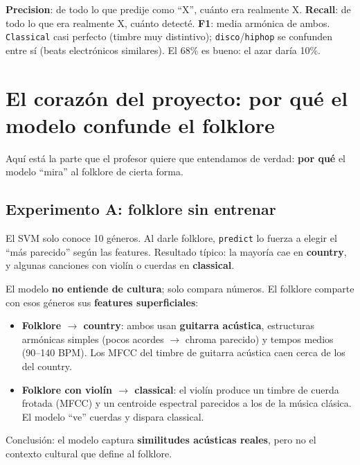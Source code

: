 \documentclass[11pt,a4paper]{article}
\newenvironment{ideabox}[1]{\begin{mdframed}[style=ideastyle,frametitle={#1}]}{\end{mdframed}}
\newenvironment{defenbox}[1]{\begin{mdframed}[style=defenstyle,frametitle={#1}]}{\end{mdframed}}
\begin{document}
\begin{ideabox}{Cómo leer estos números}
\textbf{Precision}: de todo lo que predije como ``X'', cuánto era realmente X.
\textbf{Recall}: de todo lo que era realmente X, cuánto detecté.
\textbf{F1}: media armónica de ambos. \texttt{Classical} casi perfecto (timbre
muy distintivo); \texttt{disco}/\texttt{hiphop} se confunden entre sí (beats
electrónicos similares). El 68\% es bueno: el azar daría 10\%.
\end{ideabox}

\section{El corazón del proyecto: por qué el modelo confunde el folklore}

Aquí está la parte que el profesor quiere que entendamos de verdad: \textbf{por
qué} el modelo ``mira'' al folklore de cierta forma.

\subsection{Experimento A: folklore sin entrenar}

El SVM solo conoce 10 géneros. Al darle folklore, \texttt{predict} lo fuerza a
elegir el ``más parecido'' según las features. Resultado típico: la mayoría cae
en \textbf{country}, y algunas canciones con violín o cuerdas en
\textbf{classical}.

\begin{defenbox}{La explicación acústica (clave de la defensa)}
El modelo \textbf{no entiende de cultura}; solo compara números. El folklore
comparte con esos géneros sus \textbf{features superficiales}:
\begin{itemize}[leftmargin=0.5cm]
  \item \textbf{Folklore $\rightarrow$ country}: ambos usan \textbf{guitarra
  acústica}, estructuras armónicas simples (pocos acordes $\rightarrow$ chroma
  parecido) y tempos medios (90--140 BPM). Los MFCC del timbre de guitarra
  acústica caen cerca de los del country.
  \item \textbf{Folklore con violín $\rightarrow$ classical}: el violín produce
  un timbre de cuerda frotada (MFCC) y un centroide espectral parecidos a los de
  la música clásica. El modelo ``ve'' cuerdas y dispara classical.
\end{itemize}
Conclusión: el modelo captura \textbf{similitudes acústicas reales}, pero no el
contexto cultural que define al folklore.
\end{defenbox}
\end{document}

